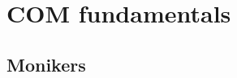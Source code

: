 \documentclass[10pt,
a4paper,
oneside,
titlepage,
bibtotocnumbered,	  %
liststotocnumbered]{scrbook}
\begin{document}
\chapter{COM fundamentals}
\section{Monikers}


\listoffigures
\listoftables

\printnoidxglossaries
\end{document}

